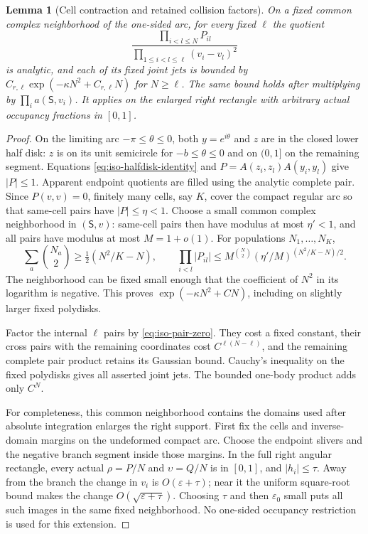 \documentclass[11pt]{article}
\numberwithin{equation}{section}
\newtheorem{lemma}[theorem]{Lemma}
\theoremstyle{definition}
\newcommand{\eps}{\varepsilon}
\begin{document}
\begin{lemma}[Cell contraction and retained collision factors]
\label{lem:iso-cell-gaussian}
On a fixed common complex neighborhood of the one-sided arc, for
every fixed $\ell$ the quotient
\[
 \frac{\prod_{i<l\le N}P_{il}}
      {\prod_{1\le i<l\le\ell}(v_i-v_l)^2}
\]
is analytic, and each of its fixed joint jets is bounded by
$C_{r,\ell}\exp(-\kappa N^2+C_{r,\ell}N)$ for $N\ge\ell$.
The same bound holds after multiplying by $\prod_i a(\mathsf S,v_i)$.
It applies on the enlarged right rectangle with arbitrary actual
occupancy fractions in $[0,1]$.
\end{lemma}
\begin{proof}
On the limiting arc $-\pi\le\theta\le0$, both $y=e^{i\theta}$ and
$z$ are in the closed lower half disk: $z$ is on its unit semicircle
for $-b\le\theta\le0$ and on $(0,1]$ on the remaining segment.
Equations \eqref{eq:iso-halfdisk-identity} and $P=A(z_i,z_l)A(y_i,y_l)$
give $|P|\le1$.  Apparent endpoint quotients are filled using the
analytic complete pair.  Since $P(v,v)=0$, finitely many cells,
say $K$, cover the compact regular arc so that same-cell pairs have
$|P|\le\eta<1$.  Choose a small common complex neighborhood in
$(\mathsf S,v)$: same-cell pairs then have modulus at most
$\eta'<1$, and all pairs have modulus at most $M=1+o(1)$.
For populations $N_1,\ldots,N_K$,
\[
 \sum_a\binom{N_a}{2}\ge\tfrac12(N^2/K-N),\qquad
 \prod_{i<l}|P_{il}|
 \le M^{\binom N2}(\eta'/M)^{(N^2/K-N)/2}.
\]
The neighborhood can be fixed small enough that the coefficient of
$N^2$ in its logarithm is negative.  This proves
$\exp(-\kappa N^2+CN)$, including on slightly larger fixed polydisks.

Factor the internal $\ell$ pairs by \eqref{eq:iso-pair-zero}.
They cost a fixed constant, their cross pairs with the remaining
coordinates cost $C^{\ell(N-\ell)}$, and the remaining complete
pair product retains its Gaussian bound.  Cauchy's inequality on the
fixed polydisks gives all asserted joint jets.  The bounded one-body
product adds only $C^N$.

For completeness, this common neighborhood contains the domains used
after absolute integration enlarges the right support.  First fix the
cells and inverse-domain margins on the undeformed compact arc.  Choose
the endpoint slivers and the negative branch segment inside those
margins.  In the full right angular rectangle, every actual
$\rho=P/N$ and $\upsilon=Q/N$ is in $[0,1]$, and
$|h_i|\le\tau$.  Away from the branch the change in $v_i$ is
$O(\eps+\tau)$; near it the uniform square-root bound makes the
change $O(\sqrt{\eps+\tau})$.  Choosing $\tau$ and then $\eps_0$
small puts all such images in the same fixed neighborhood.  No
one-sided occupancy restriction is used for this extension.
\end{proof}
\end{document}
